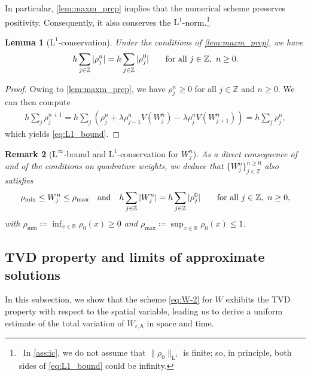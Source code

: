 \documentclass[10pt]{amsart}
\theoremstyle{plain}
\newtheorem{lemma}{Lemma}[section]
\newtheorem{remark}[lemma]{Remark}
\theoremstyle{definition}
\numberwithin{equation}{section}
\newcommand{\eps}{{\varepsilon}}
\begin{document}
In particular, \cref{lem:maxm_prcp} implies that the numerical scheme preserves positivity. Consequently, it also conserves the $\mathrm{L}^1$-norm.\footnote{~In \cref{ass:ic}, we do not assume that $\|\rho_0\|_{\mathrm{L}^1}$ is finite; so, in principle, both sides of \cref{eq:L1_bound} could be infinity.}

\begin{lemma}[$\mathrm{L}^1$-conservation]\label{cor:L1_bound}
Under the conditions of \cref{lem:maxm_prcp}, we have
\begin{equation}
h\sum_{j\in\mathbb{Z}} |\rho_j^n| = h\sum_{j\in\mathbb{Z}} |\rho_j^0|\qquad \textnormal{for all } j\in\mathbb{Z}, \ n\geq0. \label{eq:L1_bound}
\end{equation}
\end{lemma}

\begin{proof}
Owing to \cref{lem:maxm_prcp}, we have $\rho_j^n \ge 0$ for all $j \in \mathbb Z$ and $n \ge 0$. We can then compute 
\begin{align*}
h \sum_j \rho_j^{n+1} = h \sum_j \left( \rho_j^n + \lambda \rho_{j-1}^n V(W_j^n) -\lambda \rho_j^n V(W_{j+1}^n)  \right) = h \sum_j \rho_j^n,
\end{align*}
which yields \cref{eq:L1_bound}. 
\end{proof}


\begin{remark}[$\mathrm{L}^\infty$-bound and $\mathrm{L}^1$-conservation for $W_j^n$]\label{rk:W}
As a direct consequence of  and of the conditions  on quadrature weights, we deduce that $\{W_j^n\}_{j\in\mathbb{Z}}^{n\geq0}$ also satisfies
\begin{align}
    \rho_{\min} \le W_j^n \le \rho_{\max} \quad \textnormal{and}\quad h\sum_{j\in\mathbb{Z}} |W_j^n| = h\sum_{j\in\mathbb{Z}} |\rho_j^0| \qquad \textnormal{for all}\ j\in\mathbb{Z}, \ n\geq0,
\end{align}
with $\rho_{\mathrm{min}}\coloneqq\inf_{x\in\mathbb{R}}\rho_0(x)\geq0$ and $\rho_{\mathrm{max}}\coloneqq\sup_{x\in\mathbb{R}}\rho_0(x)\leq1$.
\end{remark}


\subsection{TVD property and limits of approximate solutions}
\label{ssec:TVD}

In this subsection, we show that the scheme \cref{eq:W-2} for $W$ exhibits the TVD property with respect to the spatial variable, leading us to derive a uniform estimate of the total variation of $W_{\eps,h}$ in space and time.
\end{document}
